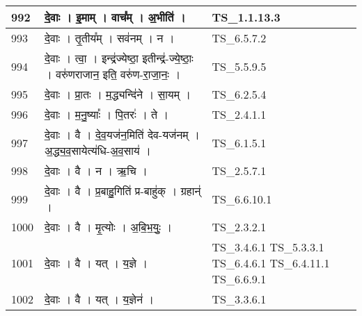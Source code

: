 \documentclass[17pt]{extarticle}
\begin{document}
\begin{longtable}{||p{0.4in}||p{4.9in}||p{0.9in}||}
    992 & दे॒वाः   ।   इ॒माम्   ।   वाच᳚म्   ।   अ॒भीति॑   ।    & TS\_1.1.13.3       \\
    
    \hline
        
    993 & दे॒वाः   ।   तृ॒तीय᳚म्   ।   सव॑नम्   ।   न   ।    & TS\_6.5.7.2       \\
    
    \hline
        
    994 & दे॒वाः   ।   त्वा॒   ।   इन्द्र॑ज्येष्ठा॒ इतीन्द्र॑{-}ज्ये॒ष्ठाः॒   ।   वरु॑णराजान॒ इति॒ वरु॑ण{-}रा॒जा॒नः॒   ।    & TS\_5.5.9.5       \\
    
    \hline
        
    995 & दे॒वाः   ।   प्रा॒तः   ।   म॒द्ध्यन्दि॑ने   ।   सा॒यम्   ।    & TS\_6.2.5.4       \\
    
    \hline
        
    996 & दे॒वाः   ।   म॒नु॒ष्याः᳚   ।   पि॒तरः॑   ।   ते   ।    & TS\_2.4.1.1       \\
    
    \hline
        
    997 & दे॒वाः   ।   वै   ।   दे॒व॒यज॑न॒मिति॑ देव{-}यज॑नम्   ।   अ॒द्ध्य॒व॒सायेत्य॑धि{-}अ॒व॒साय॑   ।    & TS\_6.1.5.1       \\
    
    \hline
        
    998 & दे॒वाः   ।   वै   ।   न   ।   ऋ॒चि   ।    & TS\_2.5.7.1       \\
    
    \hline
        
    999 & दे॒वाः   ।   वै   ।   प्र॒बाहु॒गिति॑ प्र{-}बाहु॑क्   ।   ग्रहान्॑   ।    & TS\_6.6.10.1       \\
    
    \hline
        
    1000 & दे॒वाः   ।   वै   ।   मृ॒त्योः   ।   अ॒बि॒भ॒युः॒   ।    & TS\_2.3.2.1       \\
    
    \hline
        
    1001 & दे॒वाः   ।   वै   ।   यत्   ।   य॒ज्ञे   ।    & TS\_3.4.6.1 TS\_5.3.3.1 TS\_6.4.6.1 TS\_6.4.11.1 TS\_6.6.9.1       \\
    
    \hline
        
    1002 & दे॒वाः   ।   वै   ।   यत्   ।   य॒ज्ञेन॑   ।    & TS\_3.3.6.1       \\
    

\end{longtable}
\end{document}

